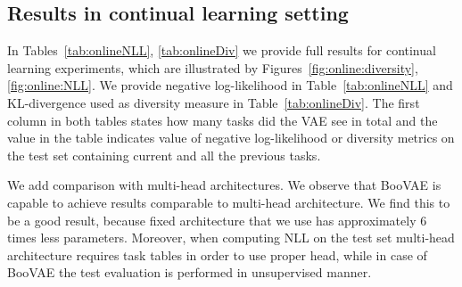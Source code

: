 \subsection{Results in continual learning setting}\label{app:incr}
In Tables~\ref{tab:onlineNLL}, \ref{tab:onlineDiv} we provide full results for continual learning experiments, which are illustrated by Figures~\ref{fig:online:diversity}, \ref{fig:online:NLL}. We provide negative log-likelihood in Table~\ref{tab:onlineNLL} and KL-divergence used as diversity measure in Table~\ref{tab:onlineDiv}. The first column in both tables states how many tasks did the VAE see in total and the value in the table indicates value of negative log-likelihood or diversity metrics on the test set containing current and all the previous tasks.

We add comparison with multi-head architectures. We observe that BooVAE is capable to achieve results comparable to multi-head architecture. We find this to be a good result, because fixed architecture that we use has approximately 6 times less parameters. Moreover, when computing NLL on the test set multi-head architecture requires task tables in order to use proper head, while in case of BooVAE the test evaluation is performed in unsupervised manner.


